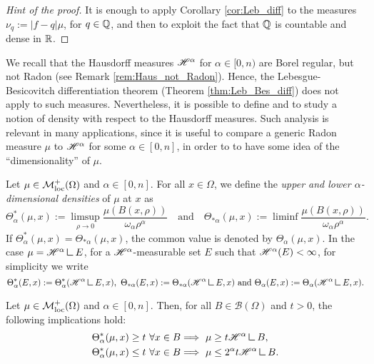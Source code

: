 \begin{proof}[Hint of the proof]
It is enough to apply Corollary \ref{cor:Leb_diff} to the measures $\nu_{q} := |f - q| \mu$, for $q \in \mathbb{Q}$, and then to exploit the fact that $\mathbb{Q}$ is countable and dense in $\mathbb{R}$.
\end{proof}

We recall that the Hausdorff measures $\mathscr{H}^{\alpha}$ for $\alpha \in [0, n)$ are Borel regular, but not Radon (see Remark \ref{rem:Haus_not_Radon}). Hence, the Lebesgue-Besicovitch differentiation theorem (Theorem \ref{thm:Leb_Bes_diff}) does not apply to such measures. Nevertheless, it is possible to define and to study a notion of density with respect to the Hausdorff measures. Such analysis is relevant in many applications, since it is useful to compare a generic Radon measure $\mu$ to $\mathscr{H}^{\alpha}$ for some $\alpha \in [0, n]$, in order to to have some idea of the ``dimensionality'' of $\mu$.

\begin{definition}
Let $\mu \in \mathcal{M}^{+}_{\rm loc}(\Omega)$ and $\alpha \in [0, n]$. For all $x \in \Omega$, we define the {\em upper and lower $\alpha$-dimensional densities} of $\mu$ at $x$ as
\begin{equation*}
\Theta^{*}_{\alpha}(\mu, x) := \limsup_{\rho \to 0} \frac{\mu(B(x, \rho))}{\omega_{\alpha} \rho^{\alpha}} \quad \text{and} \quad \Theta_{* \alpha}(\mu, x) := \liminf \frac{\mu(B(x, \rho))}{\omega_{\alpha} \rho^{\alpha}}.
\end{equation*}
If $\Theta^{*}_{\alpha}(\mu, x) = \Theta_{* \alpha}(\mu, x)$, the common value is denoted by $\Theta_{\alpha}(\mu, x)$.
In the case $\mu = \Haus{\alpha} \res E$, for a $\mathscr{H}^{\alpha}$-measurable set $E$ such that $\mathscr{H}^{\alpha}(E) < \infty$, for simplicity we write
\begin{equation*}
\Theta^{*}_{\alpha}(E, x) := \Theta^{*}_{\alpha}(\Haus{\alpha} \res E, x), \ \Theta_{* \alpha}(E, x) := \Theta_{* \alpha}(\Haus{\alpha} \res E, x) \text{ and }  \Theta_{\alpha}(E, x) := \Theta_{\alpha}(\Haus{\alpha} \res E, x).
\end{equation*}
\end{definition}

\begin{theorem} \label{thm:alpha_density}
Let $\mu \in \mathcal{M}^{+}_{\rm loc}(\Omega)$ and $\alpha \in [0, n]$. Then, for all $B \in \mathcal{B}(\Omega)$ and $t > 0$, the following implications hold:
\begin{align}
\Theta^{*}_{\alpha}(\mu, x) \ge t \ \forall x \in B & \Longrightarrow \ \mu \ge t \Haus{\alpha} \res B, \label{eq:lower_bound_density} \\
\Theta^{*}_{\alpha}(\mu, x) \le t \ \forall x \in B & \Longrightarrow \ \mu \le 2^{\alpha} t \Haus{\alpha} \res B. \label{eq:upper_bound_density}
\end{align}
\end{theorem}


